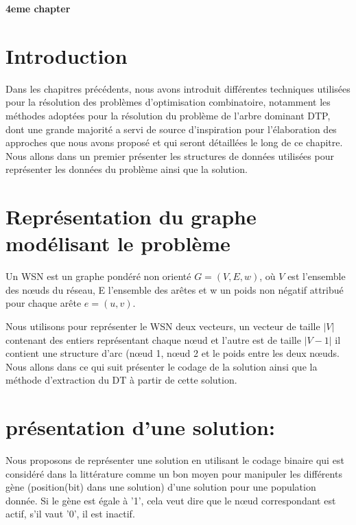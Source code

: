 \cleardoublepage


\setcounter{chapter}{4}
\setcounter{section}{0}
\setcounter{figure}{0}

\begin{center}
	\Huge\textbf{4eme chapter}
\end{center}

\section{Introduction}
Dans les chapitres précédents, nous avons introduit différentes techniques utilisées pour la résolution des problèmes d’optimisation combinatoire, notamment les méthodes adoptées pour la résolution du problème de l’arbre dominant DTP, dont une grande majorité a servi de source d’inspiration pour l’élaboration des approches que nous avons proposé et qui seront détaillées le long de ce chapitre.  Nous allons dans un premier présenter les structures de données utilisées pour représenter les données du problème ainsi que la solution.

\section{Représentation du graphe modélisant le problème}
Un WSN est un graphe pondéré non orienté $G=(V,E,w)$, où $V$ est l’ensemble des nœuds du réseau, E l’ensemble des arêtes et w un poids non négatif attribué pour chaque arête $e=(u,v)$. 

Nous utilisons pour représenter le WSN deux vecteurs, un vecteur de taille $|V|$ contenant des entiers représentant chaque nœud et l’autre est de taille $|V-1|$ il contient une structure d’arc (nœud 1, nœud 2 et le poids entre les deux nœuds. Nous allons dans ce qui suit présenter le codage de la solution ainsi que la méthode d'extraction du DT à partir de cette solution.


\section{présentation d’une solution:}
Nous proposons de représenter une solution en utilisant le codage binaire qui est considéré dans la littérature comme un bon moyen pour manipuler les différents gène (position(bit) dans une solution) d’une solution pour une population donnée. Si le gène est égale à '1', cela veut dire que le nœud correspondant est actif, s'il vaut '0', il est inactif.



